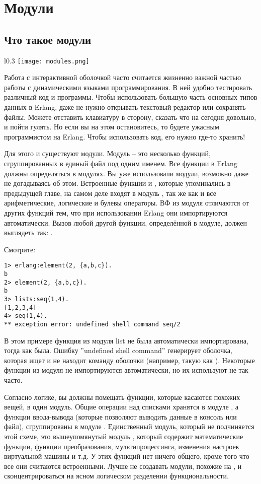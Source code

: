\chapter{Модули}\label{modules}
\section{Что такое модули}
\begin{wrapfigure}{l}{0.3\linewidth}
    \texttt{[image: modules.png]}
\end{wrapfigure}

Работа с интерактивной оболочкой часто считается жизненно важной частью работы с динамическими языками программирования.
В ней удобно тестировать различный код и программы.
Чтобы использовать большую часть основных типов данных в Erlang, даже не нужно открывать текстовый редактор или сохранять файлы.
Можете отставить клавиатуру в сторону, сказать что на сегодня довольно, и пойти гулять.
Но если вы на этом остановитесь, то будете ужасным программистом на Erlang.
Чтобы использовать код, его нужно где\--то хранить!

Для этого и существуют модули.
Модуль \--- это несколько функций, сгруппированных в единый файл под одним именем.
Все функции в Erlang должны определяться в модулях.
Вы уже использовали модули, возможно даже не догадываясь об этом.
Встроенные функции  и , которые упоминались в предыдущей главе, на самом деле входят в модуль , так же как и все арифметические, логические и булевы операторы.
ВФ из модуля  отличаются от других функций тем, что при использовании Erlang они импортируются автоматически.
Вызов любой другой функции, определённой в модуле, должен выглядеть так: .

Смотрите:
\begin{lstlisting}[style=repl]
1> erlang:element(2, {a,b,c}).
b
2> element(2, {a,b,c}).
b
3> lists:seq(1,4).
[1,2,3,4]
4> seq(1,4).
** exception error: undefined shell command seq/2
\end{lstlisting}

В этом примере функция  из модуля list не была автоматически импортирована, тогда как  была.
Ошибку ''undefined shell command'' генерирует оболочка, которая ищет и не находит команду оболочки (например, такую как ).
Некоторые функции из модуля  не импортируются автоматически, но их используют не так часто.

Согласно логике, вы должны помещать функции, которые касаются похожих вещей, в один модуль.
Общие операции над списками хранятся в модуле , а функции ввода\--вывода (которые позволяют выводить данные в консоль или файл), сгруппированы в модуле .
Единственный модуль, который не подчиняется этой схеме, это вышеупомянутый модуль , который содержит математические функции, функции преобразования, мультипроцессинга, изменения настроек виртуальной машины и т.д.
У этих функций нет ничего общего, кроме того что все они считаются встроенными.
Лучше не создавать модули, похожие на , и сконцентрироваться на ясном логическом разделении функциональности.
